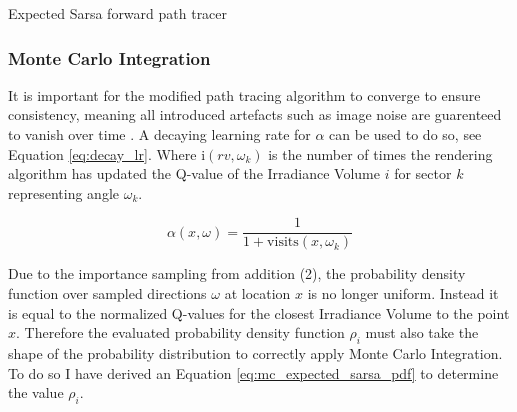 \documentclass[../dissertation.tex]{subfiles}
\begin{document}
\begin{algorithm}[H]
\label{alg:expected_sarsa_pathtracer}
\SetAlgoLined
 \caption{Expected Sarsa forward path tracer \cite{dahm2017learning}}
\end{algorithm}

\subsubsection{Monte Carlo Integration}
It is important for the modified path tracing algorithm to converge to ensure consistency, meaning all introduced artefacts such as image noise are guarenteed to vanish over time \cite{dahm2017learning}. A decaying learning rate for $\alpha$ can be used to do so, see Equation \ref{eq:decay_lr}. Where $\text{i}(rv, \omega_k)$ is the number of times the rendering algorithm has updated the Q-value of the Irradiance Volume $i$ for sector $k$ representing angle $\omega_k$.

\begin{equation}
\label{eq:decay_lr}
\alpha(x, \omega) = \frac{1}{1 + \text{visits}(x, \omega_k)}
\end{equation}

Due to the importance sampling from addition (2), the probability density function over sampled directions $\omega$ at location $x$ is no longer uniform. Instead it is equal to the normalized Q-values for the closest Irradiance Volume to the point $x$. Therefore the evaluated probability density function $\rho_i$ must also take the shape of the probability distribution to correctly apply Monte Carlo Integration. To do so I have derived an Equation \ref{eq:mc_expected_sarsa_pdf} to determine the value $\rho_i$.
\end{document}
